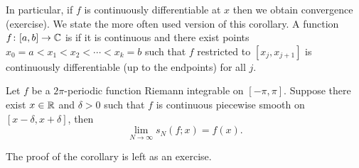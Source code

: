 In particular,
if $f$ is continuously
differentiable at $x$
then we obtain convergence (exercise).
We state the more often used version of this corollary.
A function $f \colon [a,b] \to {\mathbb{C}}$ is
\emph{}
if it is continuous and there exist points
$x_0 = a < x_1 < x_2 < \cdots < x_k = b$
such that $f$ restricted to $[x_j,x_{j+1}]$
is continuously differentiable (up to the endpoints) for all $j$.

\begin{cor} \label{cor:fourierpiecewisesmooth}
Let $f$ be a $2\pi$-periodic function
Riemann integrable on $[-\pi,\pi]$.  Suppose
there exist $x\in {\mathbb{R}}$ and $\delta > 0$ such that $f$ is continuous piecewise
smooth on $[x-\delta,x+\delta]$, then
\begin{equation*}
\lim_{N \to \infty} s_N(f;x) = f(x) .
\end{equation*}
\end{cor}

The proof of the corollary is left as an exercise.

